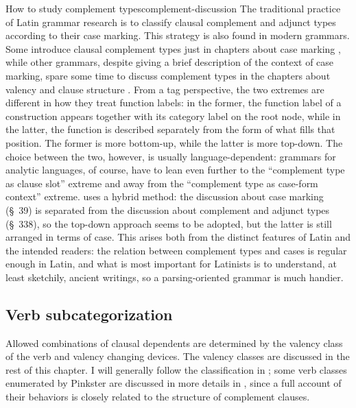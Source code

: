 \documentclass[a4paper, oneside]{report}
\newcommand*{\citesec}[1]{\S~{#1}}
\newcommand*{\citechap}[1]{chap.~{#1}}
\begin{document}
\begin{infobox}{How to study complement types}{complement-discussion}
    The traditional practice of Latin grammar research
    is to classify clausal complement and adjunct types according to their case marking.
    This strategy is also found in modern grammars.
    Some introduce clausal complement types just in chapters about case marking 
    \citep[\citechap{8}]{jacques2021grammar},
    while other grammars, despite giving a brief description of the context of case marking,
    spare some time to discuss complement types in the chapters about valency and clause structure 
    \citep[\citesec{3.4}, \citechap{19}, \citechap{22}]{forker2020grammar}.
    From a \ac{tag} perspective, 
    the two extremes are different in how they treat function labels:
    in the former, the function label of a construction appears together with its category label on the root node,
    while in the latter, the function is described separately from the form of what fills that position.
    The former is more bottom-up, 
    while the latter is more top-down.
    The choice between the two, however, is usually language-dependent:
    grammars for analytic languages, of course, have to lean even further to the 
    ``complement type as clause slot'' extreme 
    and away from the ``complement type as case-form context'' extreme.
    \citet{allen1903allen} uses a hybrid method:
    the discussion about case marking (\citesec{39}) is separated from 
    the discussion about complement and adjunct types (\citesec{338}),
    so the top-down approach seems to be adopted,
    but the latter is still arranged in terms of case.
    This arises both from the distinct features of Latin and the intended readers:
    the relation between complement types and cases is regular enough in Latin,
    and what is most important for Latinists is to understand, at least sketchily, ancient writings, 
    so a parsing-oriented grammar is much handier.
\end{infobox}

\subsection{Verb subcategorization}

Allowed combinations of clausal dependents are determined 
by the valency class of the verb and valency changing devices.
The valency classes are discussed in the rest of this chapter.
I will generally follow the classification in \citet[\citechap{4}]{Pinkster1};
some verb classes enumerated by Pinkster are discussed in more details 
in ,
since a full account of their behaviors is closely related to the structure of complement clauses.
\end{document}

